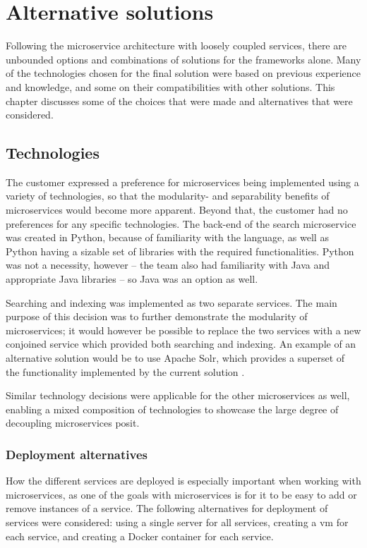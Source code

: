 
\chapter{Alternative solutions}
\label{chapterAlternativeSolutions}

Following the microservice architecture with loosely coupled services, there are unbounded options and combinations of solutions for the frameworks alone. Many of the technologies chosen for the final solution were based on previous experience and knowledge, and some on their compatibilities with other solutions. This chapter discusses some of the choices that were made and alternatives that were considered.

\section{Technologies}
The customer expressed a preference for microservices being implemented using a variety of technologies, so that the modularity- and separability benefits of microservices would become more apparent. Beyond that, the customer had no preferences for any specific technologies. The back-end of the search microservice was created in Python, because of familiarity with the language, as well as Python having a sizable set of libraries with the required functionalities. Python was not a necessity, however -- the team also had familiarity with Java and appropriate Java libraries -- so Java was an option as well.

Searching and indexing was implemented as two separate services. 
The main purpose of this decision was to further demonstrate the modularity of microservices; it would however be possible to replace the two services with a new conjoined service which provided both searching and indexing. An example of an alternative solution would be to use Apache Solr, which provides a superset of the functionality implemented by the current solution \citep{solr}.

Similar technology decisions were applicable for the other microservices as well, enabling a mixed composition of technologies to showcase the large degree of decoupling microservices posit.

\subsection{Deployment alternatives}
How the different services are deployed is especially important when working with microservices, as one of the goals with microservices is for it to be easy to add or remove instances of a service. The following alternatives for deployment of services were considered: using a single server for all services, creating a \acrshort{vm} for each service, and creating a Docker container for each service.

